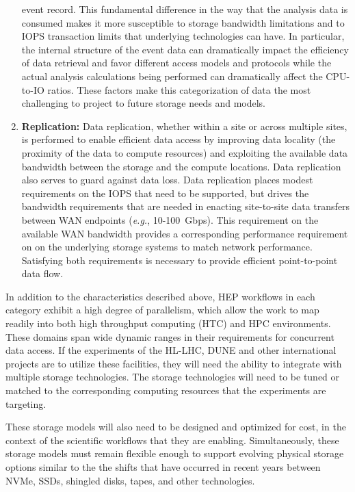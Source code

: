 \documentclass[12pt,a4paper]{article}
\begin{document}
\begin{enumerate}
  event record. This fundamental difference in the way that the analysis
  data is consumed makes it more susceptible to storage bandwidth
  limitations and to IOPS transaction limits that underlying
  technologies can have. In particular, the internal structure of the
  event data can dramatically impact the efficiency of data retrieval
  and favor different access models and protocols while the actual analysis calculations being performed can
  dramatically affect the CPU-to-IO ratios. These factors make this
  categorization of data the most challenging to project to future
  storage needs and models.
\item \textbf{Replication:} Data replication, whether within a site or
  across multiple sites, is performed to enable efficient data access by
  improving data locality (the proximity of the data to compute
  resources) and exploiting the available data bandwidth between the
  storage and the compute locations. Data replication also serves to
  guard against data loss. Data replication places modest requirements
  on the IOPS that need to be supported, but drives
  the bandwidth requirements that are needed in enacting site-to-site
  data transfers between WAN endpoints (\emph{e.g.}, 10-100~Gbps). This
  requirement on the available WAN bandwidth provides a corresponding
  performance requirement on on the underlying storage systems to match
  network performance. Satisfying both requirements is necessary to
  provide efficient point-to-point data flow.
\end{enumerate}

In addition to the characteristics described above, HEP workflows in
each category exhibit a high degree of parallelism, which allow the work
to map readily into both high throughput computing (HTC) and HPC environments. These domains span wide
dynamic ranges in their requirements for concurrent data access. If the
experiments of the HL-LHC, DUNE and other international projects
are to utilize these facilities, they will need the ability to integrate
with multiple storage technologies. The storage technologies will need
to be tuned or matched to the corresponding computing resources that the
experiments are targeting.

These storage models will also need to be designed and optimized for
cost, in the context of the scientific workflows that they are enabling.
Simultaneously, these storage models must remain flexible enough to
support evolving physical storage options similar to the the shifts that
have occurred in recent years between NVMe, SSDs, shingled disks, tapes,
and other technologies.
\end{document}
